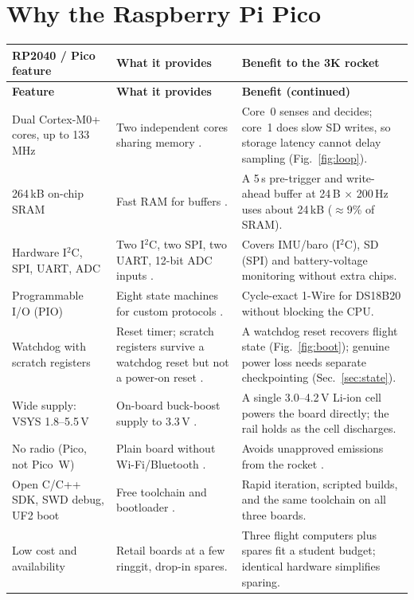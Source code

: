 \section{Why the Raspberry Pi Pico}
\small
{}
\begin{longtable}{@{}L{36mm}L{58mm}L{56mm}@{}}
\toprule{}\textbf{RP2040 / Pico feature}&\textbf{What it provides}&\textbf{Benefit to the 3K rocket}\\\midrule\endfirsthead
\toprule{}\textbf{Feature}&\textbf{What it provides}&\textbf{Benefit (continued)}\\\midrule\endhead
\bottomrule\endlastfoot
Dual Cortex-M0+ cores, up to 133\,MHz & Two independent cores sharing memory \cite{rp2040ds}. & Core~0 senses and decides; core~1 does slow SD writes, so storage latency cannot delay sampling (Fig.~\ref{fig:loop}).\\
264\,kB on-chip SRAM & Fast RAM for buffers \cite{rp2040ds}. & A 5\,s pre-trigger and write-ahead buffer at 24\,B $\times$ 200\,Hz uses about 24\,kB ($\approx$9\% of SRAM).\\
Hardware I$^2$C, SPI, UART, ADC & Two I$^2$C, two SPI, two UART, 12-bit ADC inputs \cite{rp2040ds}. & Covers IMU/baro (I$^2$C), SD (SPI) and battery-voltage monitoring without extra chips.\\
Programmable I/O (PIO) & Eight state machines for custom protocols \cite{rp2040ds}. & Cycle-exact 1-Wire for DS18B20 without blocking the CPU.\\
Watchdog with scratch registers & Reset timer; scratch registers survive a watchdog reset but not a power-on reset \cite{rp2040ds}. & A watchdog reset recovers flight state (Fig.~\ref{fig:boot}); genuine power loss needs separate checkpointing (Sec.~\ref{sec:state}).\\
Wide supply: VSYS 1.8--5.5\,V & On-board buck-boost supply to 3.3\,V \cite{picods}. & A single 3.0--4.2\,V Li-ion cell powers the board directly; the rail holds as the cell discharges.\\
No radio (Pico, not Pico~W) & Plain board without Wi-Fi/Bluetooth \cite{picods}. & Avoids unapproved emissions from the rocket \cite{rtc2027app03}.\\
Open C/C++ SDK, SWD debug, UF2 boot & Free toolchain and bootloader \cite{picosdk}. & Rapid iteration, scripted builds, and the same toolchain on all three boards.\\
Low cost and availability & Retail boards at a few ringgit, drop-in spares. & Three flight computers plus spares fit a student budget; identical hardware simplifies sparing.\\
\end{longtable}
\normalsize


